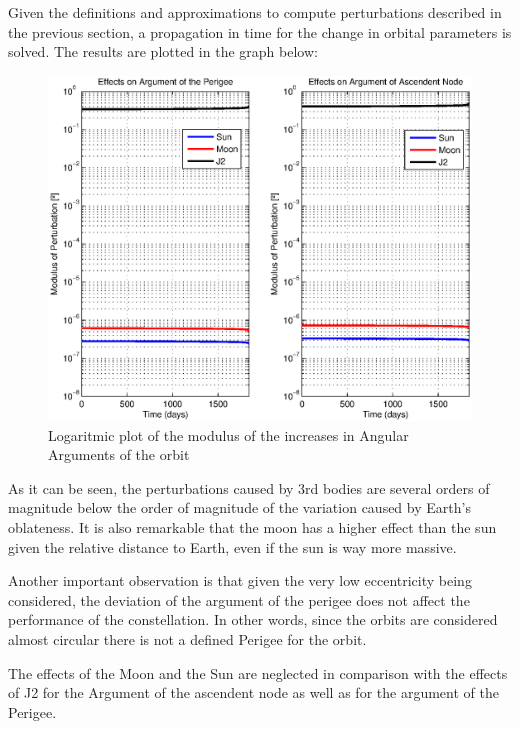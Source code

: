 Given the definitions and approximations to compute perturbations described in the previous section, a propagation in time for the change in orbital parameters is solved. The results are plotted in the graph below:

\begin{figure}[H]
\centering
\includegraphics[scale=0.7]{SignificativePerturbations/ModulusAngulars.eps}
\caption[Modulus of the increases in Angular Arguments of the orbit]{Logaritmic plot of the modulus of the increases in Angular Arguments of the orbit}
\end{figure}

As it can be seen, the perturbations caused by 3rd bodies are several orders of magnitude below the order of magnitude of the variation caused by Earth's oblateness. It is also remarkable that the moon has a higher effect than the sun given the relative distance to Earth, even if the sun is way more massive.

Another important observation is that given the very low eccentricity being considered, the deviation of the argument of the perigee does not affect the performance of the constellation. In other words, since the orbits are considered almost circular there is not a defined Perigee for the orbit.

The effects of the Moon and the Sun are neglected in comparison with the effects of J2 for the Argument of the ascendent node as well as for the argument of the Perigee.